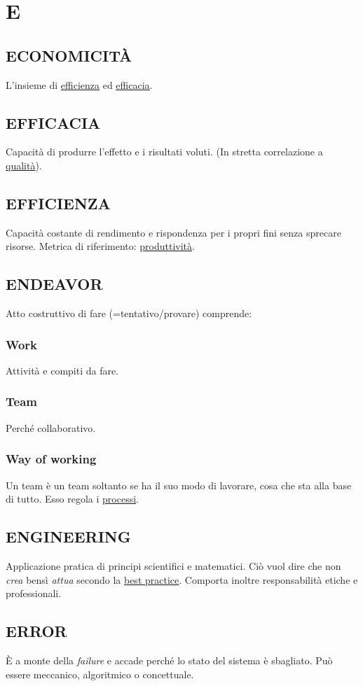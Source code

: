 \newpage
	\section{E} \label{sec:E}
	
		\subsection{ECONOMICITÀ}  \label{economicita}
		L'insieme di \underline{\hyperref[efficienza]{efficienza}} ed \underline{\hyperref[efficacia]{efficacia}}.
		
		\subsection{EFFICACIA}  \label{efficacia}
		Capacità di produrre l'effetto e i risultati voluti. (In stretta correlazione a \underline{\hyperref[qualita]{qualità}}).
		
		\subsection{EFFICIENZA}  \label{efficienza}
		Capacità costante di rendimento e rispondenza per i propri fini senza sprecare risorse. Metrica di riferimento: \underline{\hyperref[produttivita]{produttività}}.
		
		\subsection{ENDEAVOR}  \label{endeavor}
		Atto costruttivo di fare (=tentativo/provare) comprende:
			\subsubsection{Work} \label{work}
			Attività e compiti da fare.
			\subsubsection{Team} \label{team}
			Perché collaborativo.
			\subsubsection{Way of working}	\label{way}
			Un team è un team soltanto se ha il suo modo di lavorare, cosa che sta alla base di tutto. Esso regola i \underline{\hyperref[processo]{processi}}.
		
		\subsection{ENGINEERING}  \label{engineering}
		Applicazione pratica di principi scientifici e matematici. Ciò vuol dire che non \textit{crea} bensì \textit{attua} secondo la \underline{\hyperref[best]{best practice}}. Comporta inoltre responsabilità etiche e professionali.
		
		\subsection{ERROR}		\label{error}
		È a monte della \textit{failure} e accade perché lo stato del sistema è sbagliato. Può essere meccanico, algoritmico o concettuale.
	
	
